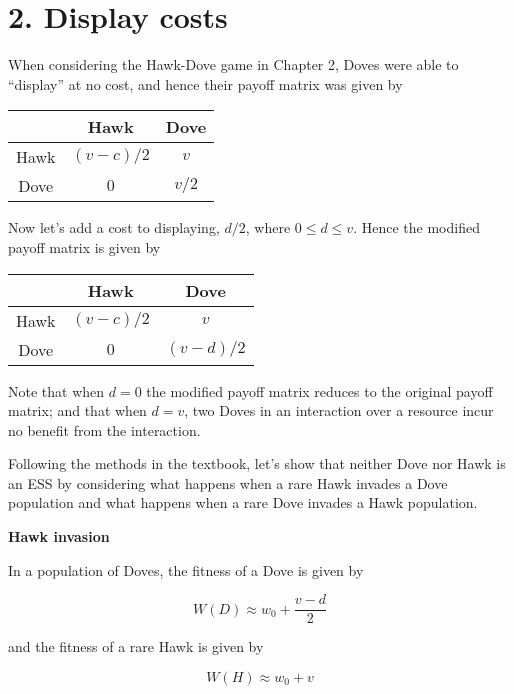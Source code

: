\documentclass{article}
\begin{document}
\section*{2. Display costs}

When considering the Hawk-Dove game in Chapter 2, Doves were able to
``display'' at no cost, and hence their payoff matrix was given by

\begin{center}
\begin{tabular}{ccc}
    & Hawk & Dove \\
    \hline
    Hawk & $(v - c) / 2$ & $v$ \\
    Dove & $0$ & $v / 2$ \\
    \hline
\end{tabular}
\end{center}

Now let's add a cost to displaying, $d / 2$, where $0 \leq d \leq v$.
Hence the modified payoff matrix is given by

\begin{center}
\begin{tabular}{ccc}
    & Hawk & Dove \\
    \hline
    Hawk & $(v - c) / 2$ & $v$ \\
    Dove & $0$ & $(v - d) / 2$ \\
    \hline
\end{tabular}
\end{center}

Note that when $d = 0$ the modified payoff matrix reduces to the
original payoff matrix; and that when $d = v$, two Doves in an
interaction over a resource incur no benefit from the interaction.

Following the methods in the textbook, let's show that neither Dove nor
Hawk is an ESS by considering what happens when a rare Hawk invades a
Dove population and what happens when a rare Dove invades a Hawk
population.

\textbf{Hawk invasion}

In a population of Doves, the fitness of a Dove is given by

\begin{equation*}
    W(D) \approx w_0 + \frac{v - d}{2}
\end{equation*}

and the fitness of a rare Hawk is given by

\begin{equation*}
    W(H) \approx w_0 + v
\end{equation*}
\end{document}
